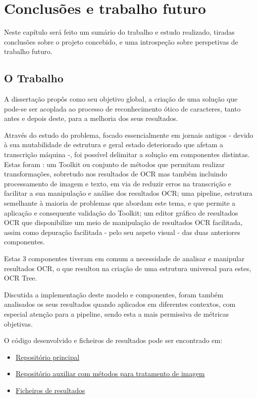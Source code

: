 \chapter{Conclusões e trabalho futuro}
\label{cap_conclusao}

Neste capítulo será feito um sumário do trabalho e estudo realizado, tiradas conclusões sobre o projeto concebido, e uma introspeção sobre perspetivas de trabalho futuro.

\section{O Trabalho}

A dissertação propôs como seu objetivo global, a criação de uma solução que pode-se ser acoplada ao processo de reconhecimento ótico de caracteres, tanto antes e depois deste, para a melhoria dos seus resultados. 

Através do estudo do problema, focado essencialmente em jornais antigos - devido à sua mutabilidade de estrutura e geral estado deteriorado que afetam a transcrição máquina -, foi possível delimitar a solução em componentes distintas. Estas foram : um Toolkit ou conjunto de métodos que permitam realizar transformações, sobretudo nos resultados de OCR mas também incluindo processamento de imagem e texto, em via de reduzir erros na transcrição e facilitar a sua manipulação e análise dos resultados OCR; uma pipeline, estrutura semelhante à maioria de problemas que abordam este tema, e que permite a aplicação e consequente validação do Toolkit; um editor gráfico de resultados OCR que disponibilize um meio de manipulação de resultados OCR facilitada, assim como depuração facilitada - pelo seu aspeto visual - das duas anteriores componentes.

Estas 3 componentes tiveram em comum a necessidade de analisar e manipular resultados OCR, o que resultou na criação de uma estrutura universal para estes, OCR Tree.

Discutida a implementação deste modelo e componentes, foram também analisados os seus resultados quando aplicados em diferentes contextos, com especial atenção para a pipeline, sendo esta a mais permissiva de métricas objetivas.

O código desenvolvido e ficheiros de resultados pode ser encontrado em:
\begin{itemize}
	\item \href{https://github.com/brazafonso/OCR-old_documents}{Repositório principal}
	\item \href{https://github.com/brazafonso/document_image_processing}{Repositório auxiliar com métodos para tratamento de imagem}
	\item \href{https://drive.google.com/drive/u/0/folders/1DW-AIuSxjEyv6ioq7jX8P1xruy03Sxo9}{Ficheiros de resultados}
\end{itemize}



